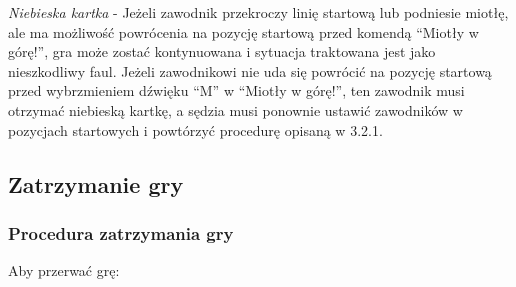 \documentclass[12pt]{article}
\begin{document}
\emph{Niebieska kartka} - Jeżeli zawodnik przekroczy linię startową lub
podniesie miotłę, ale ma możliwość powrócenia na pozycję startową przed
komendą ``Miotły w górę!'', gra może zostać kontynuowana i sytuacja
traktowana jest jako nieszkodliwy faul. Jeżeli zawodnikowi nie uda się
powrócić na pozycję startową przed wybrzmieniem dźwięku ``M'' w ``Miotły
w górę!'', ten zawodnik musi otrzymać niebieską kartkę, a sędzia musi
ponownie ustawić zawodników w pozycjach startowych i powtórzyć procedurę
opisaną w 3.2.1.

\subsection{Zatrzymanie gry}

\subsubsection{Procedura zatrzymania gry}
Aby przerwać grę:
\end{document}
